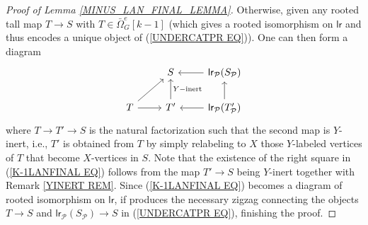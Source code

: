 \documentclass[a4paper,10pt]{article}%
\begin{document}
\begin{proof}[Proof of Lemma \ref{MINUS_LAN_FINAL_LEMMA}]
  
  Otherwise, given any rooted tall map $T \to S$ with 
  $T \in \bar{\Omega}_G^e[k-1]$ (which gives a rooted isomorphism on $\mathsf{lr}$ and thus encodes a unique object of (\ref{UNDERCATPR EQ})). One can then form a diagram
  \begin{equation}\label{K-1LANFINAL EQ}
    \begin{tikzcd}
      & S & \mathsf{lr}_{\mathcal{P}}(S_{\mathcal{P}}) \ar{l}
      \\
      T \ar{ur} \ar{r} & T' \ar{u}[swap]{Y-\text{inert}} & \mathsf{lr}_{\mathcal{P}}(T'_{\mathcal{P}}) \ar{l} \ar{u}
    \end{tikzcd}
  \end{equation}
  where $T \to T' \to S$ is the natural factorization such that the second map is $Y$-inert, i.e., $T'$ is obtained from $T$ by simply relabeling to $X$ those $Y$-labeled vertices of $T$ that become $X$-vertices in $S$. Note that the existence of the right square in (\ref{K-1LANFINAL EQ}) follows from the map $T' \to S$ being $Y$-inert together with Remark \ref{YINERT REM}.
  Since (\ref{K-1LANFINAL EQ}) becomes a diagram of rooted  isomorphism on $\mathsf{lr}$, if produces the necessary zigzag connecting the objects $T \to S$ and 
  $\mathsf{lr}_{\mathcal{P}}(S_{\mathcal{P}}) \to S$
  in (\ref{UNDERCATPR EQ}), finishing the proof.

\end{proof}
\end{document}
